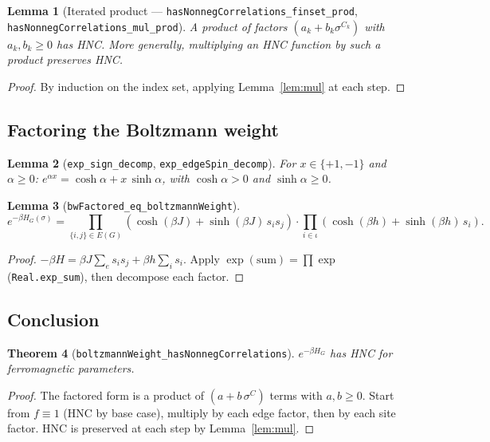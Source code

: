 \documentclass[a4paper,11pt]{article}
\newtheorem{theorem}{Theorem}
\newtheorem{lemma}[theorem]{Lemma}
\begin{document}
\begin{lemma}[Iterated product --- \texttt{hasNonnegCorrelations\_finset\_prod},
\texttt{hasNonnegCorrelations\_mul\_prod}]
A product of factors $(a_k + b_k \sigma^{C_k})$ with $a_k, b_k \geq 0$
has HNC. More generally, multiplying an HNC function by such a product
preserves HNC.
\end{lemma}

\begin{proof}
By induction on the index set, applying Lemma~\ref{lem:mul} at each step.
\end{proof}

\subsection{Factoring the Boltzmann weight}

\begin{lemma}[\texttt{exp\_sign\_decomp}, \texttt{exp\_edgeSpin\_decomp}]
For $x \in \{+1, -1\}$ and $\alpha \geq 0$:
$e^{\alpha x} = \cosh\alpha + x\,\sinh\alpha$,
with $\cosh\alpha > 0$ and $\sinh\alpha \geq 0$.
\end{lemma}

\begin{lemma}[\texttt{bwFactored\_eq\_boltzmannWeight}]
\[
  e^{-\beta H_G(\sigma)}
  = \prod_{\{i,j\} \in E(G)} (\cosh(\beta J) + \sinh(\beta J)\,s_i s_j)
  \cdot \prod_{i \in \iota} (\cosh(\beta h) + \sinh(\beta h)\,s_i).
\]
\end{lemma}

\begin{proof}
$-\beta H = \beta J \sum_e s_i s_j + \beta h \sum_i s_i$.
Apply $\exp(\text{sum}) = \prod\exp$ (\texttt{Real.exp\_sum}),
then decompose each factor.
\end{proof}

\subsection{Conclusion}

\begin{theorem}[\texttt{boltzmannWeight\_hasNonnegCorrelations}]
$e^{-\beta H_G}$ has HNC for ferromagnetic parameters.
\end{theorem}

\begin{proof}
The factored form is a product of $(a+b\,\sigma^C)$ terms with
$a,b \geq 0$. Start from $f \equiv 1$ (HNC by base case),
multiply by each edge factor, then by each site factor. HNC is
preserved at each step by Lemma~\ref{lem:mul}.
\end{proof}
\end{document}
